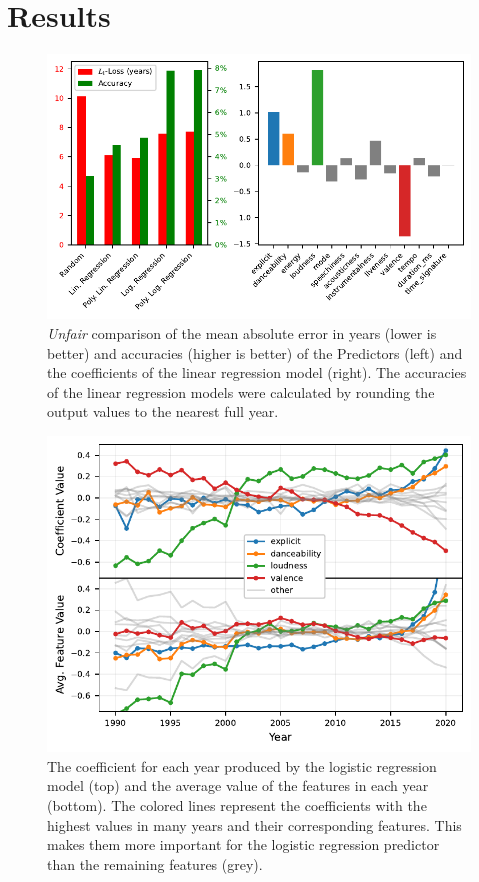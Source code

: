 \documentclass{article}
\begin{document}
\section{Results}
\begin{figure}[t]
  \centering
  \includegraphics{losses_lincoefs}
  \caption{\emph{Unfair} comparison of the mean absolute error in years (lower is better) and accuracies (higher is better) of the Predictors (left) and the coefficients of the linear regression model (right). The accuracies of the linear regression models were calculated by rounding the output values to the nearest full year.}
  \label{fig:losses_lincoefs}
\end{figure}

\begin{figure}[t]
  \centering
  \includegraphics{coefs_avg}
  \caption{The coefficient for each year produced by the logistic regression model (top) and the average value of the features in each year (bottom). The colored lines represent the coefficients with the highest values in many years and their corresponding features. This makes them more important for the logistic regression predictor than the remaining features (grey).} 
  \label{fig:coefs_avg}
\end{figure}
\end{document}
